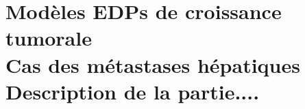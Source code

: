 \documentclass[a4paper,oneside]{book}
\newcommand{\custompart}[3]{
\part{ 
#1 \\ {
\sf %
\LARGE #2 }
\\ \vspace{3cm}
\normalsize \normalfont #3
}
}
\begin{document}

\custompart{Modèles EDPs de croissance tumorale}{Cas des métastases hépatiques}{Description de la partie.... }

%

\end{document}
